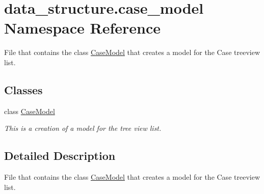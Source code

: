 \hypertarget{namespacedata__structure_1_1case__model}{}\section{data\+\_\+structure.\+case\+\_\+model Namespace Reference}
\label{namespacedata__structure_1_1case__model}


File that contains the class \hyperlink{classdata__structure_1_1case__model_1_1_case_model}{Case\+Model} that creates a model for the Case treeview list.  


\subsection*{Classes}
\begin{DoxyCompactItemize}
\item 
class \hyperlink{classdata__structure_1_1case__model_1_1_case_model}{Case\+Model}
\begin{DoxyCompactList}\small\item\em This is a creation of a model for the tree view list. \end{DoxyCompactList}\end{DoxyCompactItemize}


\subsection{Detailed Description}
File that contains the class \hyperlink{classdata__structure_1_1case__model_1_1_case_model}{Case\+Model} that creates a model for the Case treeview list. 